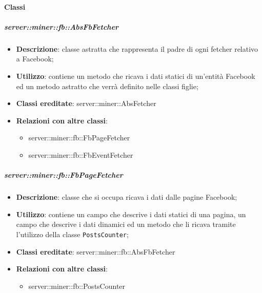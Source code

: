 	\paragraph{Classi} %
		\subparagraph{server::miner::fb::AbsFbFetcher} %
		\label{subp:server_miner_fb_AbsFbFetcher}
			\begin{itemize}
				\item \textbf{Descrizione}: classe astratta che rappresenta il padre di ogni fetcher relativo a Facebook;
				\item \textbf{Utilizzo}: contiene un metodo che ricava i dati statici di un'entità Facebook ed un metodo astratto che verrà definito nelle classi figlie;
				\item \textbf{Classi ereditate}: server::miner::AbsFetcher
				\item \textbf{Relazioni con altre classi}:
					\begin{itemize}
						\item server::miner::fb::FbPageFetcher
						\item server::miner::fb::FbEventFetcher
					\end{itemize}
			\end{itemize}

		\subparagraph{server::miner::fb::FbPageFetcher} %
		\label{subp:server_miner_fb_FbPageFetcher}
			\begin{itemize}
				\item \textbf{Descrizione}: classe che si occupa ricava i dati dalle pagine Facebook;
				\item \textbf{Utilizzo}: contiene un campo che descrive i dati statici di una pagina, un campo che descrive i dati dinamici ed un metodo che li ricava tramite l'utilizzo della classe \texttt{PostsCounter};
				\item \textbf{Classi ereditate}: server::miner::fb::AbsFbFetcher
				\item \textbf{Relazioni con altre classi}:
					\begin{itemize}
						\item server::miner::fb::PostsCounter
					\end{itemize}
			\end{itemize}

